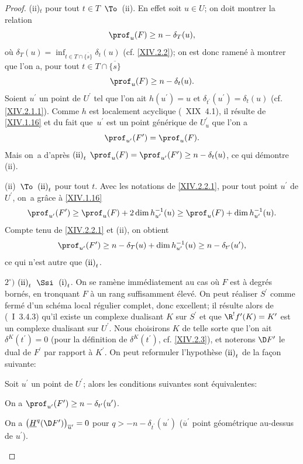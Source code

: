 \begin{proof}
\textup{(ii)}$_{t}$ pour tout $t\in T$~$\To$~\textup{(ii)}. En effet soit $u\in U$; on doit montrer la relation
$$
\prof_{u}(F)\geq n-\delta_{T}(u),
$$
o\`u $\delta_{T}(u)=\inf_{t\in T\cap\overline{\{ s\} }}\delta_{t}(u)$ (cf. \ref{XIV.2.2}); on est donc ramen\'e \`a montrer que l'on a, pour tout $t\in T\cap\overline{\{ s\} }$
$$
\prof_{u}(F)\geq n-\delta_{t}(u).
$$
Soient $u^{\prime}$ un point de $U^{\prime}$ tel que l'on ait $h(u^{\prime})=u$ et $\delta_{t^{\prime}}(u^{\prime})=\delta_{t}(u)$ (cf. \ref{XIV.2.1.1}). Comme $h$ est localement acyclique (~XIX~4.1), il r\'esulte de \ref{XIV.1.16} et du fait que~$u^{\prime}$ est un point g\'en\'erique de $U_{u}^{\prime}$ que l'on a
$$
\prof_{u^{\prime}}(F^{\prime})=\prof_{u}(F).
$$
Mais on~a d'apr\`es $\textup{(ii)}_{t}$ $\prof_{u}(F)=\prof_{u^{\prime}}(F^{\prime})\geq n-\delta_{t}(u)$, ce qui d\'emontre \textup{(ii)}.

\textup{(ii)}~$\To$~$\textup{(ii)}_{t}$ pour tout $t$. Avec les notations de \ref{XIV.2.2.1}, pour tout point $u^{\prime}$ de $U^{\prime}$, on~a gr\^ace \`a \ref{XIV.1.16}
$$
\prof_{u^{\prime}}(F^{\prime})\geq\prof_{u}(F)+2\dim h_{u^{\prime}}^{-1}(u)\geq\prof_{u}(F)+\dim h_{u^{\prime}}^{-1}(u).
$$
Compte tenu de \ref{XIV.2.2.1} et \textup{(ii)}, on obtient
$$
\prof_{u^{\prime}}(F^{\prime})\geq n-\delta_{T}(u)+\dim h_{u^{\prime}}^{-1}(u)\geq n-\delta_{t^{\prime}}(u^{\prime}),
$$
ce qui n'est autre que $\textup{(ii)}_{t}$.

$2^\circ)$ $\textup{(ii)}_{t}$~$\Ssi$~$\textup{(i)}_{t}$. On se ram\`ene imm\'ediatement au cas o\`u $F$ est \`a degr\'es born\'es, en tronquant $F$ \`a un rang suffisamment \'elev\'e. On peut r\'ealiser $S^{\prime}$ comme ferm\'e d'un sch\'ema local r\'egulier complet, donc excellent; il r\'esulte alors de (~I~3.4.3) qu'il existe un complexe dualisant $K$ sur $S^{\prime}$ et que $\R^{!}f^{\prime}(K)=K^{\prime}$ est un complexe dualisant sur $U^{\prime}$. Nous choisirons $K$ de telle sorte que l'on ait $\delta^{K}(t^{\prime})=0$ (pour la d\'efinition de $\delta^{K}(t^{\prime})$, cf. \ref{XIV.2.3}), et noterons $\D F^{\prime}$ le dual de $F^{\prime}$ par rapport \`a $K^{\prime}$. On peut reformuler l'hypoth\`ese $\textup{(ii)}_{t}$ de la fa\c con suivante:

\begin{sublemme} \label{XIV.4.2.2}
Soit $u^{\prime}$ un point de $U^{\prime}$; alors les conditions suivantes sont \'equivalentes:
\begin{enumeratei}
\item
On a $\prof_{u^{\prime}}(F^{\prime})\geq n-\delta_{t^{\prime}}(u^{\prime})$.
\item
On a $\big(\underline{H}^{q}(\D F^{\prime}) \big)_{\overline{u}^{\prime}}=0$ pour $q>-n-\delta_{t^{\prime}}(u^{\prime})$ ($\overline{u}^{\prime}$ point g\'eom\'etrique au-dessus de $u^{\prime}$).
\end{enumeratei}
\end{sublemme}


\end{proof}
